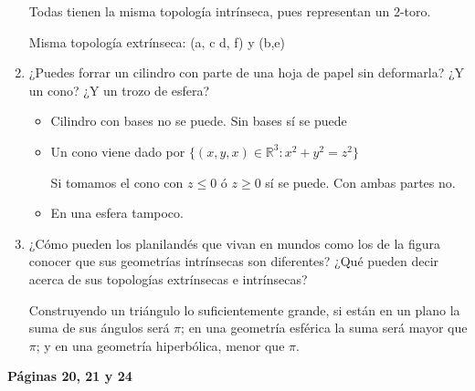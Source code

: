 \begin{enumerate}
Todas tienen la misma topología intrínseca, pues representan un 2-toro.

Misma topología extrínseca: (a, c d, f) y (b,e)

\item ¿Puedes forrar un cilindro con parte de una hoja de papel sin deformarla? ¿Y un cono? ¿Y un trozo de esfera?

\begin{itemize}

\item Cilindro con bases no se puede. Sin bases sí se puede

\item Un cono viene dado por $\{(x,y,x) \in \mathbb{R}^{3}  : x^2 + y^2 = z^2\} $
 
Si tomamos el cono con $z\leq0$ ó $z\geq0$ sí se puede. Con ambas partes no.
\item En una esfera tampoco.

\end{itemize}

\item ¿Cómo pueden los planilandés que vivan en mundos como los de la figura conocer que sus geometrías intrínsecas son diferentes? ¿Qué pueden decir acerca de sus topologías extrínsecas e intrínsecas?

Construyendo un triángulo lo suficientemente grande, si están en un plano la suma de sus ángulos será $\pi$; en una geometría esférica la suma será mayor que $\pi$; y en una geometría hiperbólica, menor que $\pi$.

\end{enumerate}

\textbf{Páginas 20, 21 y 24}

